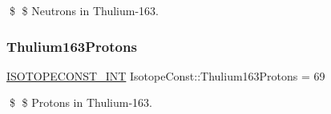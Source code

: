 \$ \$ Neutrons in Thulium-\/163. \mbox{\label{group___isotope_const-_thulium-_tm163_ga190e4d69468bbb2358aa3a7ee9c54f60}} 
\subsubsection{\texorpdfstring{Thulium163\+Protons}{Thulium163Protons}}
{\footnotesize\ttfamily \mbox{\hyperlink{group___isotope_const-_macros_ga5f18360b3e99483a35c32d789e62621c}{I\+S\+O\+T\+O\+P\+E\+C\+O\+N\+S\+T\+\_\+\+I\+NT}} Isotope\+Const\+::\+Thulium163\+Protons = 69}

\$ \$ Protons in Thulium-\/163. 
